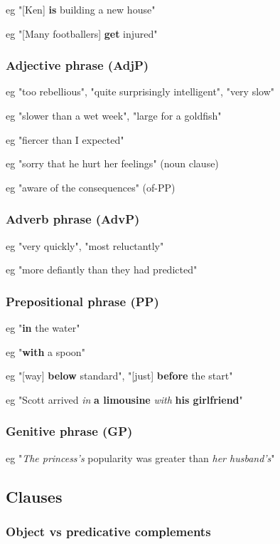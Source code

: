 eg "[Ken] \textbf{is} building a new house"

eg "[Many footballers] \textbf{get} injured"

\subsubsection{Adjective phrase (AdjP)}

eg "too rebellious", "quite surprisingly intelligent", "very slow"

eg "slower than a wet week", "large for a goldfish"

eg "fiercer than I expected"

eg "sorry that he hurt her feelings" (noun clause)

eg "aware of the consequences" (of-PP)

\subsubsection{Adverb phrase (AdvP)}

eg "very quickly", "most reluctantly"

eg "more defiantly than they had predicted"

\subsubsection{Prepositional phrase (PP)}

eg "\textbf{in} the water"

eg "\textbf{with} a spoon"

eg "[way] \textbf{below} standard", "[just] \textbf{before} the start"

eg "Scott arrived \textit{in} \textbf{a limousine} \textit{with} \textbf{his girlfriend}"

\subsubsection{Genitive phrase (GP)}

eg "\textit{The princess's} popularity was greater than \textit{her husband's}"

\subsection{Clauses}

\subsubsection{Object vs predicative complements}

